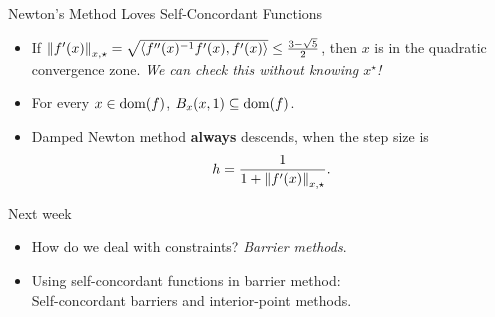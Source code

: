 \documentclass[9pt]{beamer}
\begin{document}
\begin{frame}{Newton's Method Loves Self-Concordant Functions}

  \begin{itemize}
    \setlength\itemsep{1em}
  \item If $\left\|f'(x)\right\|_{x, \star} = \sqrt{\left<f''(x)^{-1} f'(x), f'(x)\right>} \leq \frac{3-\sqrt{5}}{2}$, then $x$ is in the quadratic convergence zone. \emph{We can check this without knowing $x^\star$!}
  \item For every $x\in\operatorname{dom}(f)$, $B_x(x, 1)\subseteq \operatorname{dom}(f)$.
  \item Damped Newton method \textbf{always} descends, when the step size is $$h=\frac{1}{1+\left\|f'(x)\right\|_{x, \star}}.$$
  \end{itemize}
  
\end{frame}

\begin{frame}{Next week}

  \begin{itemize}
    \setlength\itemsep{1em}
  \item How do we deal with constraints? \emph{Barrier methods}.
  \item Using self-concordant functions in barrier method:\\
    Self-concordant barriers and interior-point methods.
  \end{itemize}
  
\end{frame}
\end{document}

